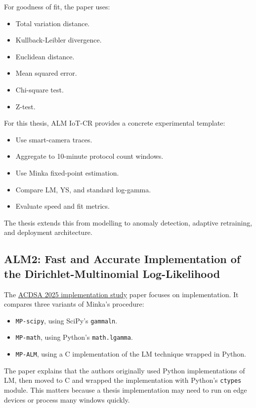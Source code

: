 \documentclass[11pt,a4paper]{article}
\begin{document}
For goodness of fit, the paper uses:

\begin{itemize}
  \item Total variation distance.
  \item Kullback-Leibler divergence.
  \item Euclidean distance.
  \item Mean squared error.
  \item Chi-square test.
  \item Z-test.
\end{itemize}

For this thesis, ALM IoT-CR provides a concrete experimental template:

\begin{itemize}
  \item Use smart-camera traces.
  \item Aggregate to 10-minute protocol count windows.
  \item Use Minka fixed-point estimation.
  \item Compare LM, YS, and standard log-gamma.
  \item Evaluate speed and fit metrics.
\end{itemize}

The thesis extends this from modelling to anomaly detection, adaptive retraining, and deployment architecture.

\subsection{ALM2: Fast and Accurate Implementation of the Dirichlet-Multinomial Log-Likelihood}

The \href{https://doi.org/10.1109/ACDSA65407.2025.11166588}{ACDSA 2025 implementation study} paper focuses on implementation. It compares three variants of Minka's procedure:

\begin{itemize}
  \item \texttt{MP-scipy}, using SciPy's \texttt{gammaln}.
  \item \texttt{MP-math}, using Python's \texttt{math.lgamma}.
  \item \texttt{MP-ALM}, using a C implementation of the LM technique wrapped in Python.
\end{itemize}

The paper explains that the authors originally used Python implementations of LM, then moved to C and wrapped the implementation with Python's \texttt{ctypes} module. This matters because a thesis implementation may need to run on edge devices or process many windows quickly.
\end{document}
